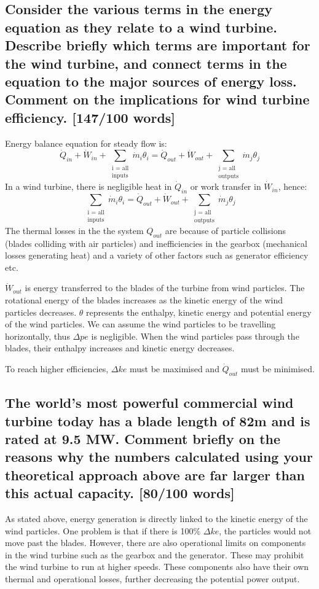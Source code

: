 \documentclass[12pt]{article}
\numberwithin{equation}{section}
\begin{document}
\begin{flushleft}
\subsection[Terms important for wind turbine.]{Consider the various terms in the energy equation as they relate to a wind turbine. Describe briefly which terms are important for the wind turbine, and connect terms in the equation to the major sources of energy loss. Comment on the implications for wind turbine efficiency. [147/100 words]}
Energy balance equation for steady flow is:
\begin{equation}
  \dot{Q}_{in} + \dot{W}_{in} + \sum_{\substack{\text{i = all} \\ \text{inputs}}} \dot{m}_i \theta_i = \dot{Q}_{out} + \dot{W}_{out} + \sum_{\substack{\text{j = all} \\ \text{outputs}}} \dot{m}_j \theta_j 
\end{equation}
In a wind turbine, there is negligible heat in $\dot{Q}_{in}$ or work transfer in $\dot{W}_{in}$, hence:
\begin{equation}
  \sum_{\substack{\text{i = all} \\ \text{inputs}}} \dot{m}_i \theta_i =  \dot{Q}_{out} + \dot{W}_{out} + \sum_{\substack{\text{j = all} \\ \text{outputs}}} \dot{m}_j \theta_j 
\end{equation}
The thermal losses in the the system $\si{Q}_{out}$ are because of particle collisions (blades colliding with air particles) and inefficiencies in the gearbox (mechanical losses generating heat) and a variety of other factors such as generator efficiency etc.

$\dot{W}_{out}$ is energy transferred to the blades of the turbine from wind particles. The rotational energy of the blades increases as the kinetic energy of the wind particles decreases. $\theta$ represents the enthalpy, kinetic energy and potential energy of the wind particles. We can assume the wind particles to be travelling horizontally, thus $\Delta pe$ is negligible. When the wind particles pass through the blades, their enthalpy increases and kinetic energy decreases. 

To reach higher efficiencies, $\Delta ke$ must be maximised and $\dot{Q}_{out}$ must be minimised.
\subsection[Power value discrepancies.]{The world’s most powerful commercial wind turbine today has a blade length of 82m and is rated at 9.5 MW. Comment briefly on the reasons why the numbers calculated using your theoretical approach above are far larger than this actual capacity. [80/100 words]}
As stated above, energy generation is directly linked to the kinetic energy of the wind particles. One problem is that if there is 100\% $\Delta ke$, the particles would not move past the blades. However, there are also operational limits on components in the wind turbine such as the gearbox and the generator. These may prohibit the wind turbine to run at higher speeds. These components also have their own thermal and operational losses, further decreasing the potential power output.


\end{flushleft}
\end{document}

